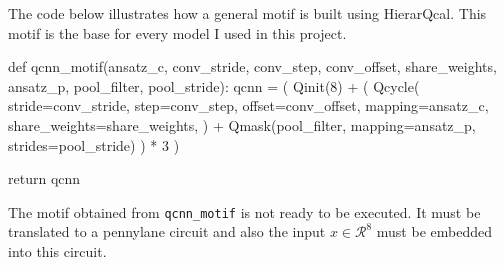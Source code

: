 \documentclass[
  13pt,
  a4paper,
  DIV=11,
  numbers=noendperiod,
  oneside]{scrreprt}
\newenvironment{Shaded}{\begin{snugshade}}{\end{snugshade}}
\newcommand{\ControlFlowTok}[1]{\textcolor[rgb]{0.00,0.23,0.31}{#1}}
\newcommand{\DecValTok}[1]{\textcolor[rgb]{0.68,0.00,0.00}{#1}}
\newcommand{\KeywordTok}[1]{\textcolor[rgb]{0.00,0.23,0.31}{#1}}
\newcommand{\NormalTok}[1]{\textcolor[rgb]{0.00,0.23,0.31}{#1}}
\newcommand{\OperatorTok}[1]{\textcolor[rgb]{0.37,0.37,0.37}{#1}}
\begin{document}
The code below illustrates how a general motif is built using
HierarQcal. This motif is the base for every model I used in this
project.

\begin{Shaded}
\begin{Highlighting}[numbers=left,,]
\KeywordTok{def}\NormalTok{ qcnn\_motif(ansatz\_c, conv\_stride, conv\_step, conv\_offset, share\_weights, ansatz\_p, pool\_filter, pool\_stride):}
\NormalTok{    qcnn }\OperatorTok{=}\NormalTok{ (}
\NormalTok{        Qinit(}\DecValTok{8}\NormalTok{)}
        \OperatorTok{+}\NormalTok{ (}
\NormalTok{            Qcycle(}
\NormalTok{                stride}\OperatorTok{=}\NormalTok{conv\_stride,}
\NormalTok{                step}\OperatorTok{=}\NormalTok{conv\_step,}
\NormalTok{                offset}\OperatorTok{=}\NormalTok{conv\_offset,}
\NormalTok{                mapping}\OperatorTok{=}\NormalTok{ansatz\_c,}
\NormalTok{                share\_weights}\OperatorTok{=}\NormalTok{share\_weights,}
\NormalTok{            )}
            \OperatorTok{+}\NormalTok{ Qmask(pool\_filter, mapping}\OperatorTok{=}\NormalTok{ansatz\_p, strides}\OperatorTok{=}\NormalTok{pool\_stride)}
\NormalTok{        )}
        \OperatorTok{*} \DecValTok{3}
\NormalTok{    )}

    \ControlFlowTok{return}\NormalTok{ qcnn}
\end{Highlighting}
\end{Shaded}

The motif obtained from \texttt{qcnn\_motif} is not ready to be
executed. It must be translated to a pennylane circuit and also the
input \(x \in \mathcal{R}^8\) must be embedded into this circuit.
\end{document}
